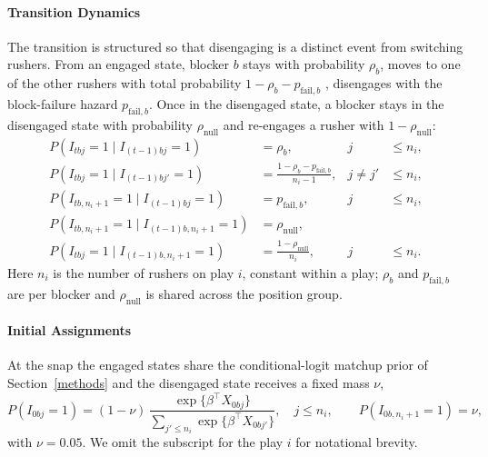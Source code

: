 \documentclass[USenglish]{article}
\theoremstyle{dgthm}
\theoremstyle{dgdef}
\begin{document}
\begin{appendices}
\paragraph{Transition Dynamics} The transition is structured so that disengaging is a distinct event from switching rushers. From an engaged state, blocker $b$ stays with probability $\rho_b$, moves to one of the other rushers with total probability $1 - \rho_b - p_{\text{fail},b}$ , disengages with the block-failure hazard $p_{\text{fail},b}$. Once in the disengaged state, a blocker stays in the disengaged state with probability $\rho_{\text{null}}$ and re-engages a rusher with $1 - \rho_{\text{null}}$:
\begin{align*}
P(I_{tbj} = 1 \mid I_{(t-1)bj} = 1) &= \rho_b, & j &\le n_i, \\
P(I_{tbj} = 1 \mid I_{(t-1)bj'} = 1) &= \frac{1 - \rho_b - p_{\text{fail},b}}{n_i - 1}, & j \ne j' &\le n_i, \\
P(I_{tb,n_i+1} = 1 \mid I_{(t-1)bj} = 1) &= p_{\text{fail},b}, & j &\le n_i, \\
P(I_{tb,n_i+1} = 1 \mid I_{(t-1)b,n_i+1} = 1) &= \rho_{\text{null}}, \\
P(I_{tbj} = 1 \mid I_{(t-1)b,n_i+1} = 1) &= \frac{1 - \rho_{\text{null}}}{n_i}, & j &\le n_i.
\end{align*}
Here $n_i$ is the number of rushers on play $i$, constant within a play; $\rho_b$ and $p_{\text{fail},b}$ are per blocker and $\rho_{\text{null}}$ is shared across the position group.

\paragraph{Initial Assignments} At the snap the engaged states share the conditional-logit matchup prior of Section~\ref{methods} and the disengaged state receives a fixed mass $\nu$,
$$ P(I_{0bj} = 1) = (1 - \nu)\,\frac{\exp\{\beta^\top X_{0bj}\}}{\sum_{j' \le n_i} \exp\{\beta^\top X_{0bj'}\}}, \quad j \le n_i, \qquad P(I_{0b,n_i+1} = 1) = \nu, $$
with $\nu = 0.05$. We omit the subscript for the play $i$ for notational brevity. 


\end{appendices}
\end{document}
